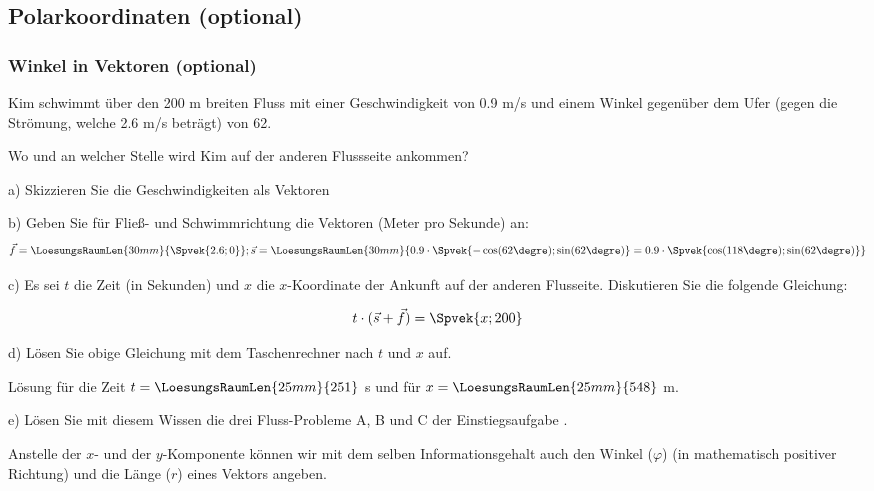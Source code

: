 \subsection{Polarkoordinaten (optional)}


\newpage

\subsubsection{Winkel in Vektoren (optional)}

Kim schwimmt über den 200 m breiten Fluss mit einer Geschwindigkeit
von 0.9 m/s und einem Winkel gegenüber dem Ufer (gegen die Strömung,
welche 2.6 m/s beträgt)
von 62\degre.

Wo und an welcher Stelle wird Kim auf der anderen Flussseite ankommen?

a) Skizzieren Sie die Geschwindigkeiten als Vektoren


b) Geben Sie für Fließ- und Schwimmrichtung die Vektoren (Meter pro Sekunde)
an:
$$\vec{f} = \LoesungsRaumLen{30mm}{\Spvek{2.6; 0}}; \vec{s} =
\LoesungsRaumLen{30mm}{0.9\cdot{}\Spvek{-\cos(62\degre);\sin(62\degre)}
  =  0.9\cdot{}\Spvek{\cos(118\degre);\sin(62\degre)}}$$

c) Es sei $t$ die Zeit (in Sekunden) und $x$ die $x$-Koordinate der
Ankunft auf der anderen Flusseite. Diskutieren Sie die folgende
Gleichung:

$$t\cdot{} (\vec{s}+\vec{f}) = \Spvek{x;200}$$

d) Lösen Sie obige Gleichung mit dem Taschenrechner nach $t$ und $x$
auf.

Lösung für die Zeit $t = \LoesungsRaumLen{25mm}{251}$ s und für $x =
\LoesungsRaumLen{25mm}{548}$ m.

\vspace{2mm}
e)
Lösen Sie mit diesem Wissen die drei Fluss-Probleme A, B und C der
Einstiegsaufgabe .
\newpage


Anstelle der $x$- und der $y$-Komponente können wir mit dem selben
Informationsgehalt auch den Winkel ($\varphi$)
(in mathematisch positiver Richtung) und die Länge ($r$) eines Vektors
angeben.


